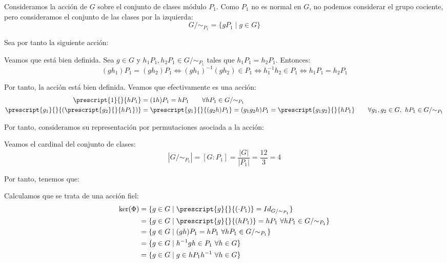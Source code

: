 \begin{ejercicio}
    Consideramos la acción de $G$ sobre el conjunto de clases módulo $P_1$. Como $P_1$ no es normal en $G$, no podemos considerar el grupo cociente, pero consideramos el conjunto de las clases por la izquierda:
    \begin{equation*}
        G/{\sim}_{P_1} = \{gP_1\mid g\in G\}
    \end{equation*}
    
    Sea por tanto la siguiente acción:

    Veamos que está bien definida. Sea $g\in G$ y $h_1P_1,h_2P_1\in G/{\sim}_{P_1}$ tales que $h_1P_1=h_2P_1$. Entonces:
    \begin{equation*}
        (gh_1)P_1 = (gh_2)P_1
        \iff (gh_1)^{-1}(gh_2) \in P_1
        \iff h_1^{-1}h_2 \in P_1
        \iff h_1P_1 = h_2P_1
    \end{equation*}

    Por tanto, la acción está bien definida. Veamos que efectivamente es una acción:
    \begin{align*}
        \prescript{1}{}{hP_1} &= (1h)P_1 = hP_1\qquad \forall hP_1\in G/{\sim}_{P_1}\\
        \prescript{g_1}{}{\left(\prescript{g_2}{}{hP_1}\right)} &= \prescript{g_1}{}{(g_2h)P_1} = (g_1g_2h)P_1 = \prescript{g_1g_2}{}{hP_1}\qquad \forall g_1,g_2\in G,\ hP_1\in G/{\sim}_{P_1}
    \end{align*}

    Por tanto, consideramos su representación por permutaciones asociada a la acción:


    Veamos el cardinal del conjunto de clases:
    \begin{equation*}
        |G/{\sim}_{P_1}| = [G:P_1] = \frac{|G|}{|P_1|} = \frac{12}{3} = 4
    \end{equation*}

    Por tanto, tenemos que:

    Calculamos que se trata de una acción fiel:
    \begin{align*}
        \ker(\Phi) &= \{g\in G\mid \prescript{g}{}{\left(\cdot P_1\right)} = Id_{G/{\sim}_{P_1}}\}\\
        &= \{g\in G\mid \prescript{g}{}{\left(hP_1\right)} = hP_1\ \forall hP_1\in G/{\sim}_{P_1}\}\\
        &= \{g\in G\mid (gh)P_1 = hP_1\ \forall hP_1\in G/{\sim}_{P_1}\}\\
        &= \{g\in G\mid h^{-1}gh \in P_1\ \forall h\in G\}\\
        &= \{g\in G\mid g\in hP_1h^{-1}\ \forall h\in G\}\\
    \end{align*}


\end{ejercicio}
